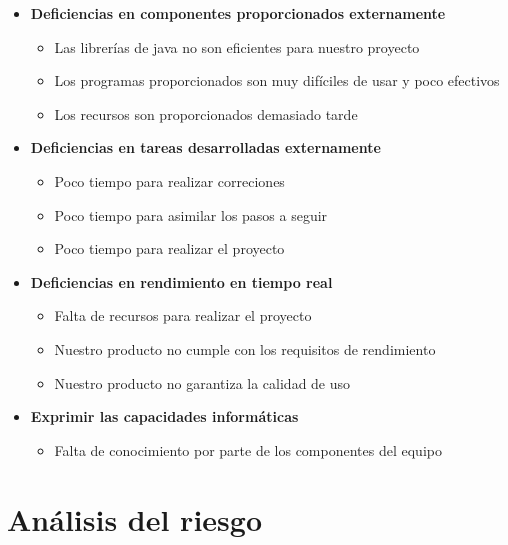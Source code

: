 \documentclass[spanish,a4paper,11pt, twoside]{report}	%
\begin{document}
\begin{itemize}
\begin{itemize}
	\end{itemize}
\item \textbf {Deficiencias en componentes proporcionados externamente}
	\begin{itemize}
		\item {Las librerías de java no son eficientes para nuestro proyecto}
		\item {Los programas proporcionados son muy difíciles de usar y poco efectivos}
		\item {Los recursos son proporcionados demasiado tarde}

	\end{itemize}
\item \textbf {Deficiencias en tareas desarrolladas externamente}
	\begin{itemize}
		\item {Poco tiempo para realizar correciones}
		\item {Poco tiempo para asimilar los pasos a seguir}
		\item {Poco tiempo para realizar el proyecto}
	\end{itemize}
\item \textbf {Deficiencias en rendimiento en tiempo real}
	\begin{itemize}
		\item {Falta de recursos para realizar el proyecto}
		\item {Nuestro producto no cumple con los requisitos de rendimiento}
		\item {Nuestro producto no garantiza la calidad de uso}
	\end{itemize}
\item \textbf {Exprimir las capacidades informáticas}
	\begin{itemize}
		\item {Falta de conocimiento por parte de los componentes del equipo}
	\end{itemize}
\end{itemize}


\newpage
\mbox{}
\thispagestyle{empty}						%
\newpage

\part{Análisis del riesgo}
\end{document}
